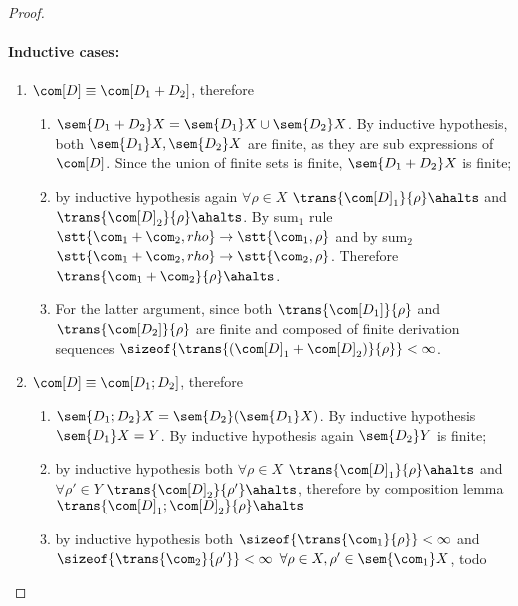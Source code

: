 \begin{proof}
  \paragraph*{Inductive cases:\\}
  \begin{enumerate}
  \item \(\com[D]\equiv \com[D_1 + D_2]\), therefore
    \begin{enumerate}[label=(\roman*).]
    \item \(\sem{D_1 + D_2} X = \sem{D_1}X \cup \sem{D_2}X\). By
      inductive hypothesis, both \(\sem{D_1}X, \sem{D_2}X\) are
      finite, as they are sub expressions of \(\com[D]\). Since the
      union of finite sets is finite, \(\sem{D_1 + D_2}X\) is finite;
    \item by inductive hypothesis again \(\forall \rho \in X\)
      \(\trans{\com[D]_1}{\rho}\ahalts\) and
      \(\trans{\com[D]_2}{\rho}\ahalts\). By sum\(_1\) rule
      \(\stt{\com_1 + \com_2, rho} \to \stt{\com_1, \rho}\) and by
      sum\(_2\) \(\stt{\com_1 + \com_2, rho} \to \stt{\com_2,
        \rho}\). Therefore \(\trans{\com_1 + \com_2}{\rho}\ahalts\).
    \item For the latter argument, since both
      \(\trans{\com[D_1]}{\rho}\) and \(\trans{\com[D_2]}{\rho}\) are
      finite and composed of finite derivation sequences
      \(\sizeof{\trans{(\com[D]_1 + \com[D]_2)}{\rho}} < \infty\).
    \end{enumerate}
  \item \(\com[D]\equiv \com[D_1; D_2]\), therefore
    \begin{enumerate}[label=(\roman*).]
    \item \(\sem{D_1;D_2}X = \sem{D_2}(\sem{D_1}X)\). By inductive
      hypothesis \(\sem{D_1}X = Y\). By inductive hypothesis again
      \(\sem{D_2}Y\) is finite;
    \item by inductive hypothesis both \(\forall \rho \in X\)
      \(\trans{\com[D]_1}{\rho}\ahalts\) and \(\forall \rho' \in Y\)
      \(\trans{\com[D]_2}{\rho'}\ahalts\), therefore by composition
      lemma \(\trans{\com[D]_1;\com[D]_2}{\rho} \ahalts\)
    \item by inductive hypothesis both
      \(\sizeof{\trans{\com_1}{\rho}} < \infty\) and
      \(\sizeof{\trans{\com_2}{\rho'}} < \infty\)
      \(\forall \rho \in X, \rho'\in \sem{\com_1}X\), todo
    \end{enumerate}
  \end{enumerate}
\end{proof}

